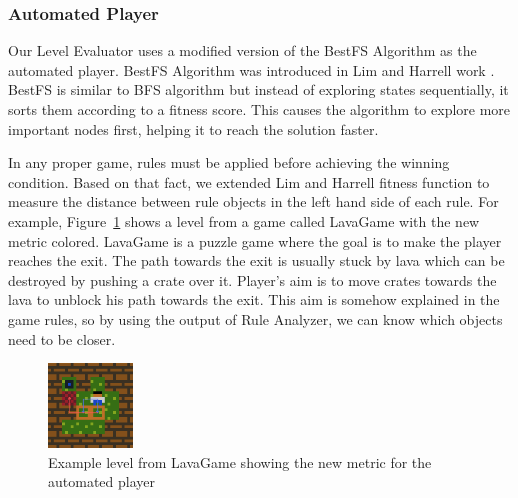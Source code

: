 \documentclass[letterpaper]{article}
\newcommand{\figref}[1]{Figure~\ref{Figure:#1}}
\begin{document}
\subsubsection{Automated Player}
Our Level Evaluator uses a modified version of the BestFS Algorithm as the automated player. BestFS Algorithm was introduced in Lim and Harrell work \cite{puzzleScriptGeneration}. BestFS is similar to BFS algorithm but instead of exploring states sequentially, it sorts them according to a fitness score. This causes the algorithm to explore more important nodes first, helping it to reach the solution faster.\\\par

In any proper game, rules must be applied before achieving the winning condition. Based on that fact, we extended Lim and Harrell fitness function to measure the distance between rule objects in the left hand side of each rule. For example, \figref{lavaGame} shows a level from a game called LavaGame with the new metric colored. LavaGame is a puzzle game where the goal is to make the player reaches the exit. The path towards the exit is usually stuck by lava which can be destroyed by pushing a crate over it. Player's aim is to move crates towards the lava to unblock his path towards the exit. This aim is somehow explained in the game rules, so by using the output of Rule Analyzer, we can know which objects need to be closer.

\begin{figure}[ht]
  	\centering
    \includegraphics[width=0.2\textwidth]{Images/lavaGame}
    \caption{Example level from LavaGame showing the new metric for the automated player}
    \label{Figure:lavaGame}
\end{figure}
\end{document}
